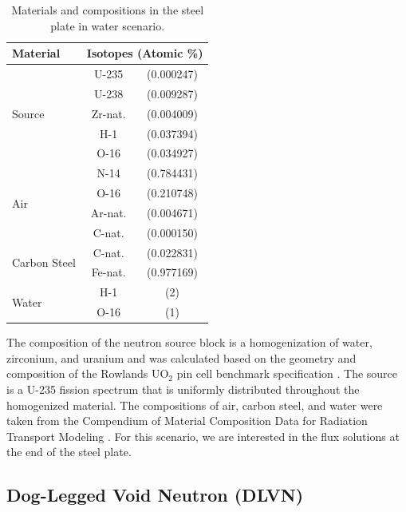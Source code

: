 \documentclass{article} %
\begin{document}
\begin{table}[!htb]
\centering
\caption{Materials and compositions in the steel plate in water scenario.}
\label{steel-mat}
\begin{tabular}{l|cc}
\textbf{Material} & \multicolumn{2}{c}{\textbf{Isotopes (Atomic \%)}} \\ \hline
\multirow{5}{*}{Source}   & U-235   & (0.000247) \\
                          & U-238   & (0.009287) \\
                          & Zr-nat. & (0.004009) \\
                          & H-1     & (0.037394) \\
                          & O-16    & (0.034927) \\ \hline
\multirow{4}{*}{Air}      & N-14    & (0.784431) \\
                          & O-16    & (0.210748) \\
                          & Ar-nat. & (0.004671) \\
                          & C-nat.  & (0.000150) \\ \hline
\multirow{2}{*}{Carbon Steel} & C-nat.  & (0.022831) \\
                              & Fe-nat. & (0.977169) \\ \hline
\multirow{2}{*}{Water}        & H-1     & (2)        \\
                              & O-16    & (1)        \\
\end{tabular}
\end{table}

The composition of the neutron source block is a homogenization of water,
zirconium, and uranium and was calculated based on the geometry and
composition of the Rowlands UO$_2$ pin cell benchmark specification
\cite{pincell}. The source is a U-235 fission  spectrum that is uniformly
distributed throughout the homogenized material. The compositions of air,
carbon steel, and water were taken from the Compendium of  Material
Composition Data for Radiation Transport Modeling \cite{pnnl}. For this
scenario, we are interested in the flux solutions at the end of the steel plate.

\subsection{Dog-Legged Void Neutron (DLVN)}
\end{document}
